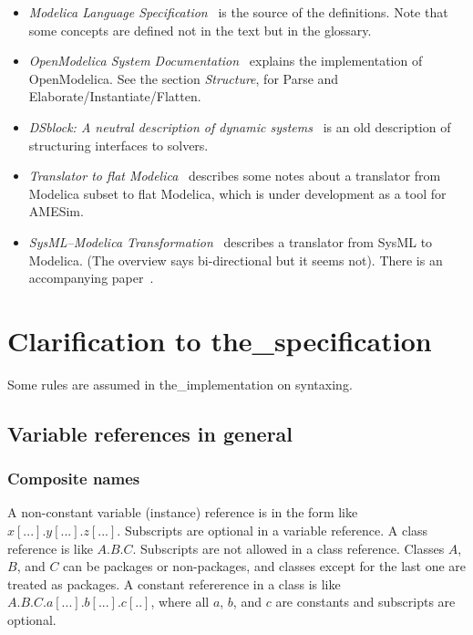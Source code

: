 \documentclass[10pt,b5paper]{article}
\begin{document}
\begin{itemize}

\item {\it{}Modelica Language Specification}~\cite{specification34} is
the source of the definitions.  Note that some concepts are defined
not in the text but in the glossary.

\item {\it{}OpenModelica System Documentation}~\cite{openmodelica2014}
explains the implementation of OpenModelica.  See the section
{\it{}Structure}, for Parse and Elaborate/Instantiate/Flatten.

\item {\it{}DSblock: A neutral description of dynamic
systems}~\cite{otter1994} is an old description of structuring
interfaces to solvers.

\item {\it{}Translator to flat Modelica}~\cite{lms2007} describes some
notes about a translator from Modelica subset to flat Modelica, which
is under development as a tool for AMESim.

\item {\it{}SysML--Modelica Transformation}~\cite{omg2012} describes a
translator from SysML to Modelica.  (The overview says bi-directional
but it seems not).  There is an accompanying paper~\cite{paredis2010}.

\end{itemize}


\section{Clarification to the_specification}

Some rules are assumed in the_implementation on syntaxing.


\subsection{Variable references in general}

\subsubsection*{Composite names}

A non-constant variable (instance) reference is in the form like
$x[...].y[...].z[...]$.  Subscripts are optional in a variable
reference.  A class reference is like $A.B.C$.  Subscripts are not
allowed in a class reference.  Classes $A$, $B$, and $C$ can be
packages or non-packages, and classes except for the last one are
treated as packages.  A constant refererence in a class is like
$A.B.C.a[...].b[...].c[..]$, where all $a$, $b$, and $c$ are constants
and subscripts are optional.
\end{document}
